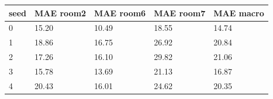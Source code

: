 \begin{tabular}{lllll}
\hline
seed & MAE room2 & MAE room6 & MAE room7 & MAE macro \\
\hline
0 & 15.20 & 10.49 & 18.55 & 14.74 \\
1 & 18.86 & 16.75 & 26.92 & 20.84 \\
2 & 17.26 & 16.10 & 29.82 & 21.06 \\
3 & 15.78 & 13.69 & 21.13 & 16.87 \\
4 & 20.43 & 16.01 & 24.62 & 20.35 \\
\hline
\end{tabular}
